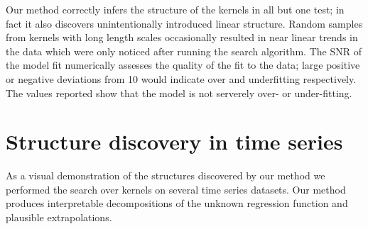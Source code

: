 \documentclass[twoside]{article}
\begin{document}
Our method correctly infers the structure of the kernels in all but one test; in fact it also discovers unintentionally introduced linear structure. 
Random samples from \kSE{} kernels with long length scales occasionally resulted in near linear trends in the data which were only noticed after running the search algorithm.
The SNR of the model fit numerically assesses the quality of the fit to the data; large positive or negative deviations from 10 would indicate over and underfitting respectively.
The values reported show that the model is not serverely over- or under-fitting.





\section{Structure discovery in time series}
\label{sec:time_series}


As a visual demonstration of the structures discovered by our method we performed the search over kernels on several time series datasets.
Our method produces interpretable decompositions of the unknown regression function and plausible extrapolations.
\end{document}
